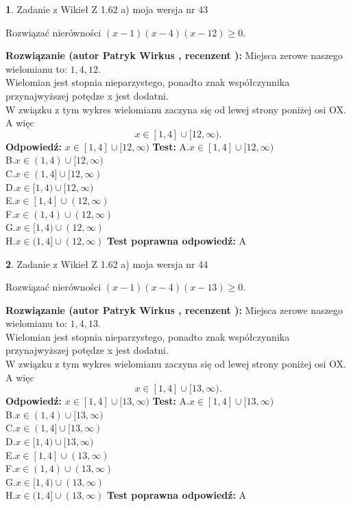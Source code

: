 \documentclass[12pt, a4paper]{article}
\theoremstyle{definition} %
\newtheorem{zad}{}
\newcommand{\zadStart}[1]{\begin{zad}#1\newline}
\newcommand{\zadStop}{\end{zad}}
\newcommand{\rozwStart}[2]{\noindent \textbf{Rozwiązanie (autor #1 , recenzent #2): }\newline}
\newcommand{\rozwStop}{\newline}
\newcommand{\odpStart}{\noindent \textbf{Odpowiedź:}\newline}
\newcommand{\odpStop}{\newline}
\newcommand{\testStart}{\noindent \textbf{Test:}\newline}
\newcommand{\testStop}{\newline}
\newcommand{\kluczStart}{\noindent \textbf{Test poprawna odpowiedź:}\newline}
\newcommand{\kluczStop}{\newline}
\begin{document}
\zadStart{Zadanie z Wikieł Z 1.62 a) moja wersja nr 43}

Rozwiązać nierówności $(x-1)(x-4)(x-12)\ge0$.
\zadStop
\rozwStart{Patryk Wirkus}{}
Miejsca zerowe naszego wielomianu to: $1, 4, 12$.\\
Wielomian jest stopnia nieparzystego, ponadto znak współczynnika przy\linebreak najwyższej potędze x jest dodatni.\\ W związku z tym wykres wielomianu zaczyna się od lewej strony poniżej osi OX. A więc $$x \in [1,4] \cup [12,\infty).$$
\rozwStop
\odpStart
$x \in [1,4] \cup [12,\infty)$
\odpStop
\testStart
A.$x \in [1,4] \cup [12,\infty)$\\
B.$x \in (1,4) \cup [12,\infty)$\\
C.$x \in (1,4] \cup [12,\infty)$\\
D.$x \in [1,4) \cup [12,\infty)$\\
E.$x \in [1,4] \cup (12,\infty)$\\
F.$x \in (1,4) \cup (12,\infty)$\\
G.$x \in [1,4) \cup (12,\infty)$\\
H.$x \in (1,4] \cup (12,\infty)$
\testStop
\kluczStart
A
\kluczStop



\zadStart{Zadanie z Wikieł Z 1.62 a) moja wersja nr 44}

Rozwiązać nierówności $(x-1)(x-4)(x-13)\ge0$.
\zadStop
\rozwStart{Patryk Wirkus}{}
Miejsca zerowe naszego wielomianu to: $1, 4, 13$.\\
Wielomian jest stopnia nieparzystego, ponadto znak współczynnika przy\linebreak najwyższej potędze x jest dodatni.\\ W związku z tym wykres wielomianu zaczyna się od lewej strony poniżej osi OX. A więc $$x \in [1,4] \cup [13,\infty).$$
\rozwStop
\odpStart
$x \in [1,4] \cup [13,\infty)$
\odpStop
\testStart
A.$x \in [1,4] \cup [13,\infty)$\\
B.$x \in (1,4) \cup [13,\infty)$\\
C.$x \in (1,4] \cup [13,\infty)$\\
D.$x \in [1,4) \cup [13,\infty)$\\
E.$x \in [1,4] \cup (13,\infty)$\\
F.$x \in (1,4) \cup (13,\infty)$\\
G.$x \in [1,4) \cup (13,\infty)$\\
H.$x \in (1,4] \cup (13,\infty)$
\testStop
\kluczStart
A
\kluczStop
\end{document}
